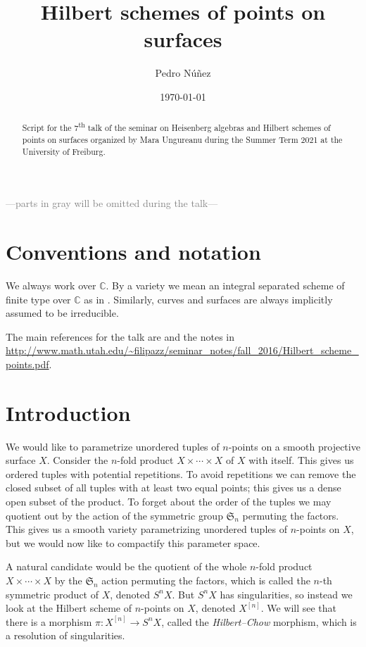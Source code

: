 \documentclass[12pt,a4paper]{amsart}
\title[Hilbert schemes of points on surfaces]{Hilbert schemes of points on surfaces}
\author[Pedro N\'{u}\~{n}ez]{Pedro N\'{u}\~{n}ez}
\date{\today}
\theoremstyle{plain}
\theoremstyle{definition}
\theoremstyle{remark}
\begin{document}
\maketitle

\begin{abstract}
  Script for the 7\textsuperscript{th} talk of the seminar on Heisenberg algebras and Hilbert schemes of points on surfaces organized by Mara Ungureanu during the Summer Term 2021 at the University of Freiburg.
\end{abstract}

\tableofcontents

\begin{center}
  \textcolor{gray}{---parts in gray will be omitted during the talk---}
\end{center}

\setcounter{section}{-1}

\section{Conventions and notation}

We always work over $\mathbb{C}$.
By a variety we mean an integral separated scheme of finite type over $\mathbb{C}$ as in \cite{har77}.
Similarly, curves and surfaces are always implicitly assumed to be irreducible.

The main references for the talk are \cite[\S 1]{nak99} and the notes in \url{http://www.math.utah.edu/~filipazz/seminar_notes/fall_2016/Hilbert_scheme_points.pdf}.

\section{Introduction}

We would like to parametrize unordered tuples of $n$-points on a smooth projective surface $X$.
Consider the $n$-fold product $X \times \cdots \times X$ of $X$ with itself.
This gives us ordered tuples with potential repetitions.
To avoid repetitions we can remove the closed subset of all tuples with at least two equal points; this gives us a dense open subset of the product.
To forget about the order of the tuples we may quotient out by the action of the symmetric group $\mathfrak{S}_{n}$ permuting the factors.
This gives us a smooth variety parametrizing unordered tuples of $n$-points on $X$, but we would now like to compactify this parameter space.

A natural candidate would be the quotient of the whole $n$-fold product $X \times \cdots \times X$ by the $\mathfrak{S}_{n}$ action permuting the factors, which is called the $n$-th symmetric product of $X$, denoted $S^{n}X$.
But $S^{n}X$ has singularities, so instead we look at the Hilbert scheme of $n$-points on $X$, denoted $X^{[n]}$.
We will see that there is a morphism $\pi \colon X^{[n]} \to S^{n}X$, called the \textit{Hilbert--Chow} morphism, which is a resolution of singularities.
\end{document}
